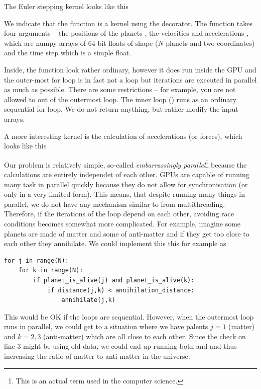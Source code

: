 The Euler stepping kernel looks like this

We indicate that the function is a kernel using the  decorator. The function takes four arguments -- the positions of the planets , the velocities  and accelerations , which are numpy arrays of 64 bit floats of shape  ($N$ planets and two coordinates) and the time step  which is a simple float.

Inside, the function look rather ordinary, however it does run inside the GPU and the outer-most for loop is in fact not a loop but iterations are executed in parallel as much as possible. There are some restrictions -- for example, you are not allowed to  out of the outermost loop. The inner loop () runs as an ordinary sequential for loop. We do not return anything, but rather modify the input arrays.

A more interesting kernel is the calculation of accelerations (or forces), which looks like this


Our problem is relatively simple, so-called \emph{embarrassingly parallel}\footnote{This is an actual term used in the computer science.} because the calculations are entirely independet of each other. GPUs are capable of running many task in parallel quickly because they do not allow for synchronisation (or only in a very limited form). This means, that despite running many things in parallel, we do not have any mechanism similar to  from multithreading. Therefore, if the iterations of the loop depend on each other, avoiding race conditions becomes somewhat more complicated. For example, imagine some planets are made of matter and some of anti-matter and if they get too close to each other they annihilate. We could implement this this for example as
\begin{lstlisting}
for j in range(N):
    for k in range(N):
        if planet_is_alive(j) and planet_is_alive(k):
            if distance(j,k) < annihilation_distance:
                annihilate(j,k)
\end{lstlisting}
This would be OK if the loops are sequential. However, when the outermost loop runs in parallel, we could get to a situation where we have palents $j=1$ (matter) and $k=2, 3$ (anti-matter) which are all close to each other. Since the check on line 3 might be using old data, we could end up running both  and  and thus increasing the ratio of matter to anti-matter in the universe.

